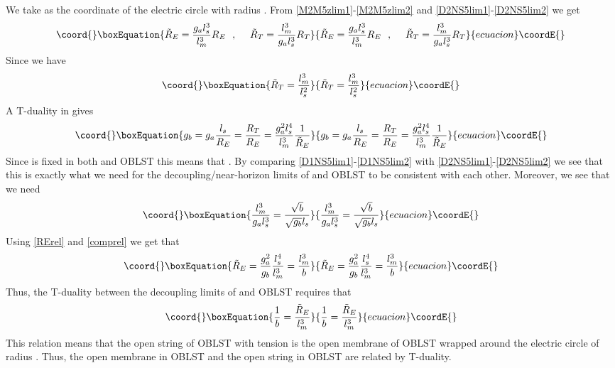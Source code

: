 \documentclass[a4paper,twoside,titlepage,12pt]{article}
\begin{document}
We take \coordHE{} as the coordinate of the electric circle with 
radius \coordHE{}. 
From \eqref{M2M5zlim1}-\eqref{M2M5zlim2} and 
\eqref{D2NS5lim1}-\eqref{D2NS5lim2} we get
%
\begin{equation}\coord{}\boxEquation{
\tilde{R}_E = \frac{\gsna \lsn^3}{\lm^3} R_E
\spa
\tilde{R}_T = \frac{\lm^3}{\gsna \lsn^3} R_T
}{
\tilde{R}_E = \frac{\gsna \lsn^3}{\lm^3} R_E
\spa
\tilde{R}_T = \frac{\lm^3}{\gsna \lsn^3} R_T
}{ecuacion}\coordE{}\end{equation}
%
Since \coordHE{} we have
%
\begin{equation}\coord{}\boxEquation{
\tilde{R}_T = \frac{\lm^3}{\lsn^2}
}{
\tilde{R}_T = \frac{\lm^3}{\lsn^2}
}{ecuacion}\coordE{}\end{equation}
%
A T-duality in \coordHE{} gives
%
\begin{equation}\coord{}\boxEquation{
\label{RErel}
\gsnb = \gsna \frac{\lsn}{R_E} = \frac{R_T}{R_E} 
= \frac{\gsna^2 \lsn^4}{\lm^3} \frac{1}{\tilde{R}_E}
}{
\gsnb = \gsna \frac{\lsn}{R_E} = \frac{R_T}{R_E} 
= \frac{\gsna^2 \lsn^4}{\lm^3} \frac{1}{\tilde{R}_E}
}{ecuacion}\coordE{}\end{equation}
%
Since \coordHE{} is fixed in both \coordHE{} and \coordHE{} OBLST
this means that \coordHE{}. By comparing
\eqref{D1NS5lim1}-\eqref{D1NS5lim2} with
\eqref{D2NS5lim1}-\eqref{D2NS5lim2} 
we see that this is exactly what we need for the decoupling/near-horizon
limits of \coordHE{} and \coordHE{} OBLST to be consistent with each other. 
Moreover, we see that we need
%
\begin{equation}\coord{}\boxEquation{
\label{comprel}
\frac{\lm^3}{\gsna \lsn^3} = \frac{\sqrt{b}}{\sqrt{\gsnb} \lsn}
}{
\frac{\lm^3}{\gsna \lsn^3} = \frac{\sqrt{b}}{\sqrt{\gsnb} \lsn}
}{ecuacion}\coordE{}\end{equation}
%
Using \eqref{RErel} and \eqref{comprel} we get that
%
\begin{equation}\coord{}\boxEquation{
\tilde{R}_E = \frac{\gsna^2}{\gsnb} \frac{\lsn^4}{\lm^3}
= \frac{\lm^3}{b}
}{
\tilde{R}_E = \frac{\gsna^2}{\gsnb} \frac{\lsn^4}{\lm^3}
= \frac{\lm^3}{b}
}{ecuacion}\coordE{}\end{equation}
%
Thus, the T-duality between the decoupling limits of \coordHE{} and \coordHE{}
OBLST requires that
%
\begin{equation}\coord{}\boxEquation{
\frac{1}{b} = \frac{\tilde{R}_E}{\lm^3}
}{
\frac{1}{b} = \frac{\tilde{R}_E}{\lm^3}
}{ecuacion}\coordE{}\end{equation}
%
This relation means that the open string of \coordHE{} OBLST with
tension \coordHE{} is the open membrane of \coordHE{} OBLST wrapped
around the electric circle of radius \coordHE{}. 
Thus, the open membrane in \coordHE{} OBLST
and the open string in \coordHE{} OBLST are related by T-duality.
\end{document}
